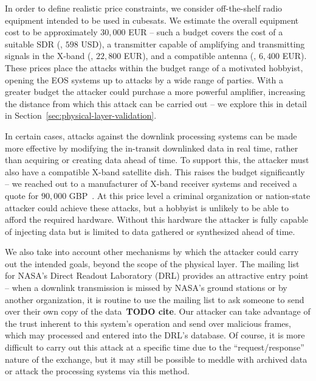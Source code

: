 In order to define realistic price constraints, we consider off-the-shelf radio equipment intended to be used in cubesats.
We estimate the overall equipment cost to be approximately $30,000$ EUR -- such a budget covers the cost of a suitable SDR (\cite{limeSdr,limeCompanion}, $598$ USD), a transmitter capable of amplifying and transmitting signals in the X-band (\cite{endurosat:xbandtransmitter}, $22,800$ EUR), and a compatible antenna (\cite{endurosat:xbandantenna}, $6,400$ EUR).
These prices place the attacks within the budget range of a motivated hobbyist, opening the EOS systems up to attacks by a wide range of parties.
With a greater budget the attacker could purchase a more powerful amplifier, increasing the distance from which this attack can be carried out -- we explore this in detail in Section~\ref{sec:physical-layer-validation}.

In certain cases, attacks against the downlink processing systems can be made more effective by modifying the in-transit downlinked data in real time, rather than acquiring or creating data ahead of time.
To support this, the attacker must also have a compatible X-band satellite dish.
This raises the budget significantly -- we reached out to a manufacturer of X-band receiver systems and received a quote for $90,000$ GBP~\cite{dartcomsystemsltdXBandOverview2021}.
At this price level a criminal organization or nation-state attacker could achieve these attacks, but a hobbyist is unlikely to be able to afford the required hardware.
Without this hardware the attacker is fully capable of injecting data but is limited to data gathered or synthesized ahead of time.

We also take into account other mechanisms by which the attacker could carry out the intended goals, beyond the scope of the physical layer.
The mailing list for NASA's Direct Readout Laboratory (DRL) provides an attractive entry point -- when a downlink transmission is missed by NASA's ground stations or by another organization, it is routine to use the mailing list to ask someone to send over their own copy of the data~\textbf{TODO cite}. %
Our attacker can take advantage of the trust inherent to this system's operation and send over malicious frames, which may processed and entered into the DRL's database.
Of course, it is more difficult to carry out this attack at a specific time due to the ``request/response'' nature of the exchange, but it may still be possible to meddle with archived data or attack the processing systems via this method.
